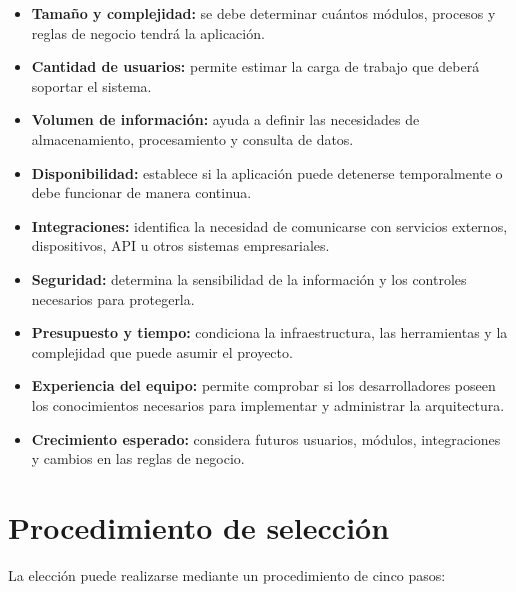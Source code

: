 \documentclass[12pt]{article}
\begin{document}
	\begin{itemize}
		
		\item \textbf{Tamaño y complejidad:} se debe determinar cuántos módulos,
		procesos y reglas de negocio tendrá la aplicación.
		
		\item \textbf{Cantidad de usuarios:} permite estimar la carga de trabajo
		que deberá soportar el sistema.
		
		\item \textbf{Volumen de información:} ayuda a definir las necesidades de
		almacenamiento, procesamiento y consulta de datos.
		
		\item \textbf{Disponibilidad:} establece si la aplicación puede detenerse
		temporalmente o debe funcionar de manera continua.
		
		\item \textbf{Integraciones:} identifica la necesidad de comunicarse con
		servicios externos, dispositivos, API u otros sistemas empresariales.
		
		\item \textbf{Seguridad:} determina la sensibilidad de la información y
		los controles necesarios para protegerla.
		
		\item \textbf{Presupuesto y tiempo:} condiciona la infraestructura, las
		herramientas y la complejidad que puede asumir el proyecto.
		
		\item \textbf{Experiencia del equipo:} permite comprobar si los
		desarrolladores poseen los conocimientos necesarios para implementar y
		administrar la arquitectura.
		
		\item \textbf{Crecimiento esperado:} considera futuros usuarios, módulos,
		integraciones y cambios en las reglas de negocio.
		
	\end{itemize}
	
	\section*{Procedimiento de selección}
	
	La elección puede realizarse mediante un procedimiento de cinco pasos:
	
\end{document}
